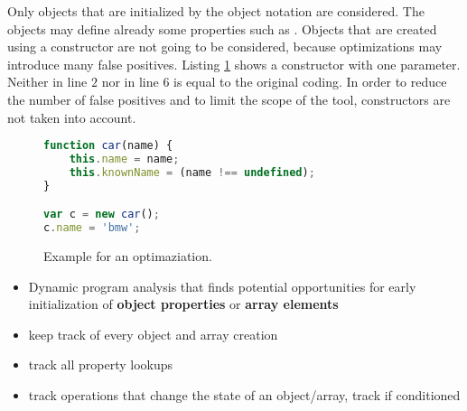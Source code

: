 Only objects that are initialized by the object notation \js{\{\}} are considered. The objects may define already some properties such as . Objects that are created using a constructor are not going to be considered, because optimizations may introduce many false positives. Listing \ref{list:example3} shows a constructor with one parameter. Neither  in line $2$ nor   in line $6$ is equal to the original coding. In order to reduce the number of false positives and to limit the scope of the tool, constructors are not taken into account.

\begin{figure}
\begin{lstlisting}[language=Javascript]
function car(name) {
    this.name = name;
    this.knownName = (name !== undefined);
}

var c = new car();
c.name = 'bmw';
\end{lstlisting}
\caption{Example for an optimaziation.}\label{list:example3}
\end{figure}

\begin{itemize}
\item Dynamic program analysis that finds potential opportunities for early initialization of \textbf{object properties} or \textbf{array elements}
\item keep track of every object and array creation
\item track all property lookups
\item track operations that change the state of an object/array, track if conditioned
\end{itemize}